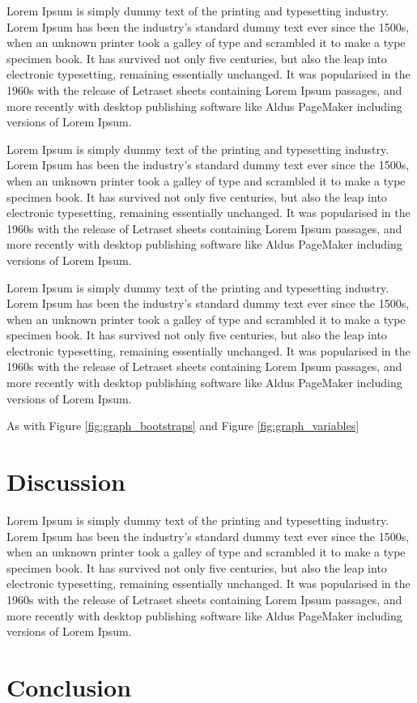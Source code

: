 \documentclass[12pt]{article}
\begin{document}
Lorem Ipsum is simply dummy text of the printing and typesetting industry. Lorem Ipsum has been the industry's standard dummy text ever since the 1500s, when an unknown printer took a galley of type and scrambled it to make a type specimen book. It has survived not only five centuries, but also the leap into electronic typesetting, remaining essentially unchanged. It was popularised in the 1960s with the release of Letraset sheets containing Lorem Ipsum passages, and more recently with desktop publishing software like Aldus PageMaker including versions of Lorem Ipsum.

Lorem Ipsum is simply dummy text of the printing and typesetting industry. Lorem Ipsum has been the industry's standard dummy text ever since the 1500s, when an unknown printer took a galley of type and scrambled it to make a type specimen book. It has survived not only five centuries, but also the leap into electronic typesetting, remaining essentially unchanged. It was popularised in the 1960s with the release of Letraset sheets containing Lorem Ipsum passages, and more recently with desktop publishing software like Aldus PageMaker including versions of Lorem Ipsum.



Lorem Ipsum is simply dummy text of the printing and typesetting industry. Lorem Ipsum has been the industry's standard dummy text ever since the 1500s, when an unknown printer took a galley of type and scrambled it to make a type specimen book. It has survived not only five centuries, but also the leap into electronic typesetting, remaining essentially unchanged. It was popularised in the 1960s with the release of Letraset sheets containing Lorem Ipsum passages, and more recently with desktop publishing software like Aldus PageMaker including versions of Lorem Ipsum.

As with Figure \ref{fig:graph_bootstraps} and Figure \ref{fig:graph_variables}

\section{Discussion}

Lorem Ipsum is simply dummy text of the printing and typesetting industry. Lorem Ipsum has been the industry's standard dummy text ever since the 1500s, when an unknown printer took a galley of type and scrambled it to make a type specimen book. It has survived not only five centuries, but also the leap into electronic typesetting, remaining essentially unchanged. It was popularised in the 1960s with the release of Letraset sheets containing Lorem Ipsum passages, and more recently with desktop publishing software like Aldus PageMaker including versions of Lorem Ipsum.


\section{Conclusion}

\newpage


\end{document}
